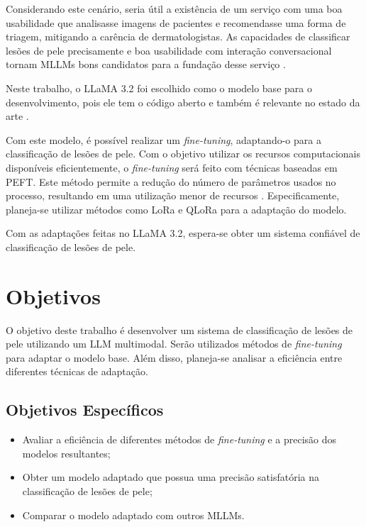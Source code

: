 Considerando este cenário, seria útil a existência de um serviço com uma boa usabilidade que analisasse imagens de pacientes e recomendasse uma forma de triagem,
mitigando a carência de dermatologistas. As capacidades de classificar lesões de pele precisamente e boa usabilidade com interação conversacional tornam \acp{MLLM}
bons candidatos para a fundação desse serviço \cite{mllm_success_rate}.

Neste trabalho, o \ac{LLaMA} 3.2 foi escolhido como o modelo base para o desenvolvimento, pois ele tem o código aberto e também é relevante no estado da arte
\cite{dubey2024llama}.


Com este modelo, é possível realizar um \textit{fine-tuning}, adaptando-o para a classificação de lesões de pele. Com o objetivo utilizar os recursos computacionais
disponíveis eficientemente, o \textit{fine-tuning} será feito com técnicas baseadas em \ac{PEFT}. Este método permite a redução do número de parâmetros usados no
processo, resultando em uma utilização menor de recursos \cite{peft}. Especificamente, planeja-se utilizar métodos como \ac{LoRa} e \ac{QLoRa} para a adaptação do modelo.

Com as adaptações feitas no \ac{LLaMA} 3.2, espera-se obter um sistema confiável de classificação de lesões de pele.


\section{Objetivos}

O objetivo deste trabalho é desenvolver um sistema de classificação de lesões de pele utilizando um \ac{LLM} multimodal. Serão utilizados métodos de \textit{fine-tuning}
para adaptar o modelo base. Além disso, planeja-se analisar a eficiência entre diferentes técnicas de adaptação.

\subsection*{Objetivos Específicos}

\begin{itemize}
    \item Avaliar a eficiência de diferentes métodos de \textit{fine-tuning} e a precisão dos modelos resultantes;
    \item Obter um modelo adaptado que possua uma precisão satisfatória na classificação de lesões de pele;
    \item Comparar o modelo adaptado com outros \acp{MLLM}.
\end{itemize}
